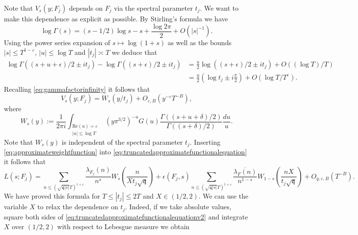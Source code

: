 \documentclass{article}
\theoremstyle{named}
\newcommand{\q}{\mathfrak{q}}
\begin{document}
Note that $V_s(y; F_j)$ depends on $F_j$ via the spectral parameter $t_j$. We want to make this dependence as explicit as possible. By Stirling's formula we have 
\begin{equation*}
    \log \Gamma(s) = (s - 1/2)\log s - s + \frac{\log 2\pi}{2} + O(|s|^{-1}).
\end{equation*}
Using the power series expansion of $s \mapsto \log(1 + s)$ as well as the bounds $|s|\leq T^{1-\varepsilon}$, $|u| \leq \log T$ and $|t_j| \asymp T$ we deduce that 
\begin{equation*}
\begin{aligned}
    \log \Gamma((s + u + \epsilon)/2 \pm it_j) - \log \Gamma((s + \epsilon)/2 \pm it_j) & = \frac{u}{2} \log((s + \epsilon)/2 \pm it_j) + O((\log T)/T)\\
    & = \frac{u}{2}(\log t_j \pm i\frac{\pi}{2}) + O(\log T/T^\varepsilon).
\end{aligned}
\end{equation*}
Recalling \eqref{eq:gammafactorinfinity} it follows that
\begin{equation}\label{eq:approximateweightfunction}
    V_s(y; F_j) = W_s(y/t_j) + O_{\varepsilon, B}(y^{-\varepsilon} T^{-B}),
\end{equation}
where
\begin{equation}\label{eq:defiapproximateweightfunction}
    W_s(y) := \frac{1}{2\pi i}\int_{\substack{\text{Re}(u) = \varepsilon\\
    |u| \leq \log T}} (y \pi^{3/2})^{-u} G(u) \frac{\Gamma((s + u + \delta)/2)}{\Gamma((s + \delta)/2)}\frac{du}{u}.
\end{equation}
Note that $W_s(y)$ is independent of the spectral parameter $t_j$. Inserting \eqref{eq:approximateweightfunction} into \eqref{eq:truncatedapproximatefunctionalequation} it follows that 
\begin{equation}\label{eq:truncatedapproximatefunctionalequationv2}
    L(s; F_j) = \sum_{n \leq (\sqrt{\q|s|}T)^{1 + \varepsilon}} \frac{\lambda_{F_j}(n)}{n^s}W_s\left(\frac{n}{Xt_j \sqrt{\q}}\right) + \epsilon(F_j, s)\sum_{n \leq (\sqrt{\q|s|}T)^{1 + \varepsilon}} \frac{\overline{\lambda_F(n)}}{n^{1-s}}W_{1-s}\left(\frac{nX}{t_j \sqrt{\q}}\right) + O_{q, \varepsilon, B}(T^{-B}).
\end{equation}
We have proved this formula for $T \leq |t_j| \leq 2T$ and $X \in (1/2, 2)$. We can use the variable $X$ to relax the dependence on $t_j$. Indeed, if we take absolute values, square both sides of \eqref{eq:truncatedapproximatefunctionalequationv2} and integrate $X$ over $(1/2, 2)$ with respect to Lebesgue measure we obtain
\end{document}
